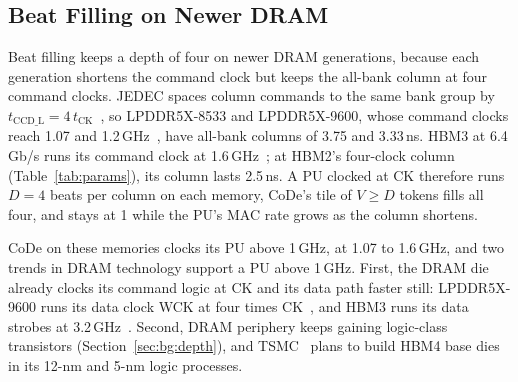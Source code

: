 \subsection{Beat Filling on Newer DRAM}
\label{sec:disc:newdram}

Beat filling keeps a depth of four on newer DRAM generations, because each generation shortens the command clock but
keeps the all-bank column at four command clocks. JEDEC spaces column commands to the same bank group by $t_\mathrm{CCD\_L} = 4\,t_\mathrm{CK}$~\cite{jedeclpddr5}, so
LPDDR5X-8533 and LPDDR5X-9600, whose command clocks reach 1.07 and 1.2\,GHz~\cite{micronlp5x}, have all-bank columns of
3.75 and 3.33\,ns. HBM3 at 6.4\,Gb/s runs its command clock at 1.6\,GHz~\cite{synopsyshbm3}; at HBM2's four-clock
column (Table~\ref{tab:params}), its column lasts 2.5\,ns\ASSUMPTION. A PU clocked at CK therefore runs $D = 4$ beats
per column on each memory, CoDe's tile of $V \ge D$ tokens fills all four, and \UMAC stays at 1 while
the PU's MAC rate grows as the column shortens.

CoDe on these memories clocks its PU above 1\,GHz, at 1.07 to 1.6\,GHz, and two trends in DRAM technology support a
PU above 1\,GHz. First, the DRAM die already clocks its command logic at CK and its data path faster still:
LPDDR5X-9600 runs its data clock WCK at four times CK~\cite{micronlp5x}, and HBM3 runs its data strobes at
3.2\,GHz~\cite{synopsyshbm3}. Second, DRAM periphery keeps gaining logic-class transistors (Section~\ref{sec:bg:depth}), and TSMC~\cite{tsmchbm4} plans to build HBM4 base dies in its 12-nm and 5-nm
logic processes.
